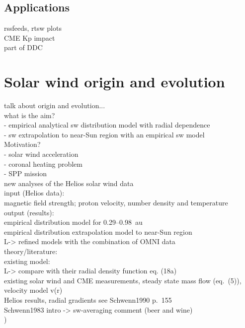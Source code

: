 \section{Applications}

rssfeeds, rtsw plots\\
CME Kp impact\\
part of DDC\\



\chapter{Solar wind origin and evolution}


talk about origin and evolution...\\

what is the aim?\\
- empirical analytical sw distribution model with radial dependence\\
- sw extrapolation to near-Sun region with an empirical sw model\\

Motivation?\\
- solar wind acceleration\\
- coronal heating problem\\
- SPP mission\\

new analyses of the Helios solar wind data\\

input (Helios data):\\
	magnetic field strength; proton velocity, number density and temperature\\

output (results):\\
	empirical distribution model for 0.29--0.98~au\\
	empirical distribution extrapolation model to near-Sun region\\
	L-> refined models with the combination of OMNI data\\
	
theory/literature:\\
existing model: \citep{Sittler1999}\\
L-> compare with their radial density function eq. (18a)\\
existing solar wind and CME measurements, steady state mass flow (eq.~(5)), velocity model v(r) \citep{Sheeley1997}\\
Helios results, radial gradients see Schwenn1990 p.~155\\
Schwenn1983 intro -> sw-averaging comment (beer and wine)\\)

